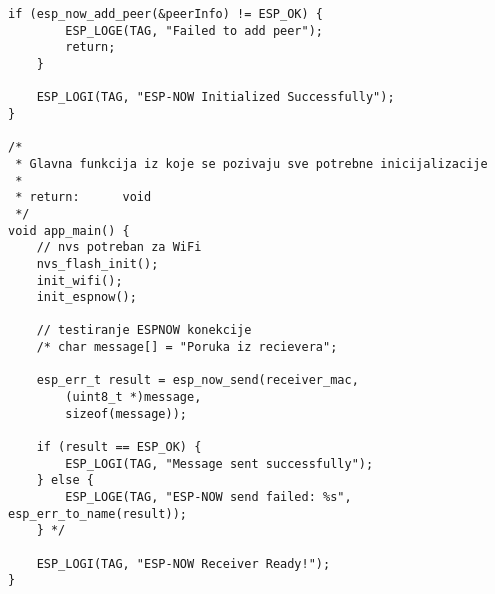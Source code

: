 \documentclass[seminarskirad]{fer}
\begin{document}
\begin{lstlisting}[caption=ESP-NOW receiver]
    if (esp_now_add_peer(&peerInfo) != ESP_OK) {
        ESP_LOGE(TAG, "Failed to add peer");
        return;
    }

    ESP_LOGI(TAG, "ESP-NOW Initialized Successfully");
}

/*
 * Glavna funkcija iz koje se pozivaju sve potrebne inicijalizacije
 * 
 * return:      void
 */
void app_main() {
    // nvs potreban za WiFi
    nvs_flash_init();
    init_wifi();
    init_espnow();

    // testiranje ESPNOW konekcije
    /* char message[] = "Poruka iz recievera";
    
    esp_err_t result = esp_now_send(receiver_mac, 
        (uint8_t *)message, 
        sizeof(message));

    if (result == ESP_OK) {
        ESP_LOGI(TAG, "Message sent successfully");
    } else {
        ESP_LOGE(TAG, "ESP-NOW send failed: %s", esp_err_to_name(result));
    } */

    ESP_LOGI(TAG, "ESP-NOW Receiver Ready!");
}
\end{lstlisting}
\end{document}
